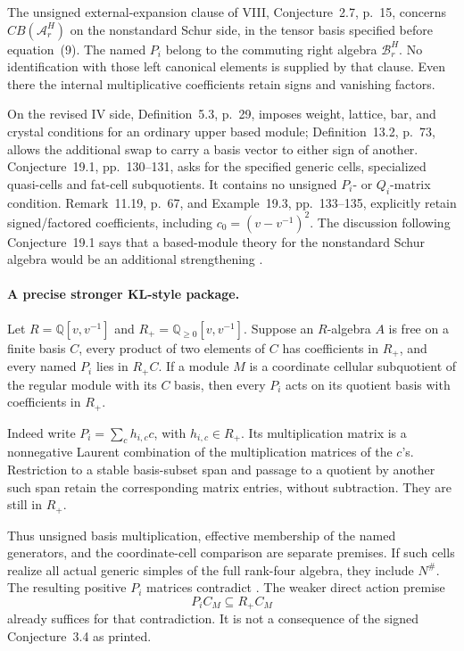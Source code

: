 The unsigned external-expansion clause of VIII,
Conjecture~2.7, p.~15, concerns \(CB(\mathcal A_r^H)\)
on the nonstandard Schur side, in the tensor basis
specified before equation~(9).
The named \(P_i\) belong to the commuting right algebra
\(\mathcal B_r^H\). No identification with those left
canonical elements is supplied by that clause.
Even there the internal multiplicative coefficients
retain signs and vanishing factors.

On the revised IV side, Definition~5.3, p.~29, imposes
weight, lattice, bar, and crystal conditions for an
ordinary upper based module; Definition~13.2, p.~73,
allows the additional swap to carry a basis vector to
either sign of another.
Conjecture~19.1, pp.~130--131, asks for the specified
generic cells, specialized quasi-cells and fat-cell
subquotients. It contains no unsigned \(P_i\)- or
\(Q_i\)-matrix condition.
Remark~11.19, p.~67, and Example~19.3, pp.~133--135,
explicitly retain signed/factored coefficients,
including \(c_0=(v-v^{-1})^2\).
The discussion following Conjecture~19.1 says that a
based-module theory for the nonstandard Schur algebra
would be an additional strengthening \cite{IV}.

\paragraph{A precise stronger KL-style package.}
Let \(R=\mathbb Q[v,v^{-1}]\) and
\(R_+=\mathbb Q_{\ge0}[v,v^{-1}]\).
Suppose an \(R\)-algebra \(A\) is free on a finite basis
\(C\), every product of two elements of \(C\) has
coefficients in \(R_+\), and every named \(P_i\) lies
in \(R_+C\).
If a module \(M\) is a coordinate cellular subquotient
of the regular module with its \(C\) basis, then every
\(P_i\) acts on its quotient basis with coefficients
in \(R_+\).

Indeed write \(P_i=\sum_c h_{i,c}c\), with
\(h_{i,c}\in R_+\). Its multiplication matrix is a
nonnegative Laurent combination of the multiplication
matrices of the \(c\)'s.
Restriction to a stable basis-subset span and passage
to a quotient by another such span retain the
corresponding matrix entries, without subtraction.
They are still in \(R_+\).

Thus unsigned basis multiplication, effective membership
of the named generators, and the coordinate-cell
comparison are separate premises.
If such cells realize all actual generic simples of the
full rank-four algebra, they include \(N^\#\).
The resulting positive \(P_i\) matrices contradict
.
The weaker direct action premise
\[
                       P_iC_M\subseteq R_+C_M
\]
already suffices for that contradiction.
It is not a consequence of the signed
Conjecture~3.4 as printed.

